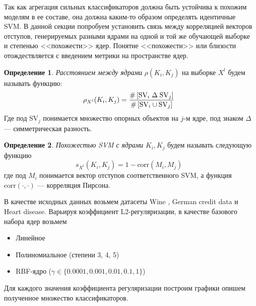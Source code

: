 \documentclass[12pt,twoside]{article}
\theoremstyle{plain}
\theoremstyle{remark}
\theoremstyle{definition}
\newtheorem{df}{Определение}[section]
\begin{document}
Так как агрегация сильных классификаторов должна быть устойчива к похожим моделям в ее составе, она должна каким-то образом определять идентичные SVM. В данной секции попробуем установить связь между корреляцией векторов отступов,
генерируемых
разными ядрами на одной и той же обучающей выборке и степенью <<похожести>>
ядер. Понятие <<похожести>> или близости отождествляется с введением метрики
на пространстве ядер. 
\begin{df}
	\emph{Расстоянием между ядрами} $\rho(K_i, K_j)$ на выборке $X^l$ будем называть функцию:
$$
\rho_{X^l}(K_i, K_j) = \frac{\#\left[\mathrm{SV}_i \;\Delta\; \mathrm{SV}_j\right]}
{\#\left[\mathrm{SV}_i \cup \mathrm{SV}_j\right]}
$$
Где под $\mathrm{SV}_j$ понимается множество опорных объектов на $j$-м ядре, под
знаком $\Delta$ --- симметрическая разность.
\end{df}
\begin{df}
	\emph{Похожестью SVM с ядрами} $K_i, K_j$ будем называть следующую функцию
$$
s_{X^l}(K_i, K_j) = 1 - \mathrm{corr}(M_i, M_j)
$$	
где под $M_i$ понимается вектор отступов соответственного SVM, а функция $\mathrm{corr}(\cdot, \cdot)$ --- корреляция Пирсона. 
\end{df}

В качестве исходных данных
возьмем датасеты Wine \cite{UCI:Wine}, German credit data\cite{UCI:German} и
Heart disease\cite{UCI:Heart}. Варьируя коэффициент L2-регуляризации, в качестве базового набора ядер возьмем

\begin{itemize}
    \item Линейное
    \item Полиномиальное (степени 3, 4, 5)
    \item RBF-ядро ($\gamma \in \{0.0001, 0.001, 0.01, 0.1, 1\}$)
\end{itemize}

Для каждого значения коэффициента регуляризации построим графики
опишем полученное множество классификаторов.


\end{document}
